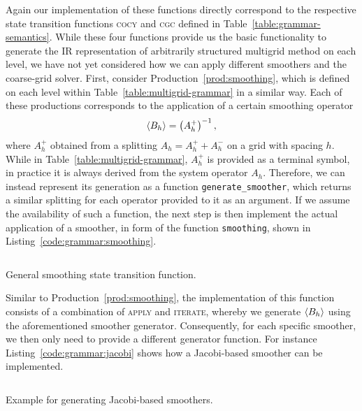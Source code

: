 Again our implementation of these functions directly correspond to the respective state transition functions \textsc{cocy} and \textsc{cgc} defined in Table~\ref{table:grammar-semantics}.
While these four functions provide us the basic functionality to generate the IR representation of arbitrarily structured multigrid method on each level, we have not yet considered how we can apply different smoothers and the coarse-grid solver.
First, consider Production~\ref{prod:smoothing}, which is defined on each level within Table~\ref{table:multigrid-grammar} in a similar way.
Each of these productions corresponds to the application of a certain smoothing operator 
\begin{equation*}
	\langle B_{h} \rangle = \left( A^+_{h} \right)^{-1},
\end{equation*}
where $A^+_{h}$ obtained from a splitting $A_{h} = A^+_{h} + A^-_{h}$ on a grid with spacing $h$.
While in Table~\ref{table:multigrid-grammar}, $A^+_{h}$ is provided as a terminal symbol, in practice it is always derived from the system operator $A_{h}$.
Therefore, we can instead represent its generation as a function \texttt{generate\_smoother}, which returns a similar splitting for each operator provided to it as an argument.
If we assume the availability of such a function, the next step is then implement the actual application of a smoother, in form of the function \texttt{smoothing}, shown in Listing~\ref{code:grammar:smoothing}.
\begin{listing}
	\inputminted{python}{evostencils/grammar/smoothing.py}
	\caption{General smoothing state transition function.}
	\label{code:grammar:smoothing}
\end{listing}
Similar to Production~\ref{prod:smoothing}, the implementation of this function consists of a combination of \textsc{apply} and \textsc{iterate}, whereby we generate $\langle B_{h} \rangle$ using the aforementioned smoother generator.
Consequently, for each specific smoother, we then only need to provide a different generator function.
For instance Listing~\ref{code:grammar:jacobi} shows how a Jacobi-based smoother can be implemented.
\begin{listing}
	\inputminted{python}{evostencils/grammar/jacobi.py}
	\caption{Example for generating Jacobi-based smoothers.}
	\label{code:grammar:jacobi}
\end{listing}


